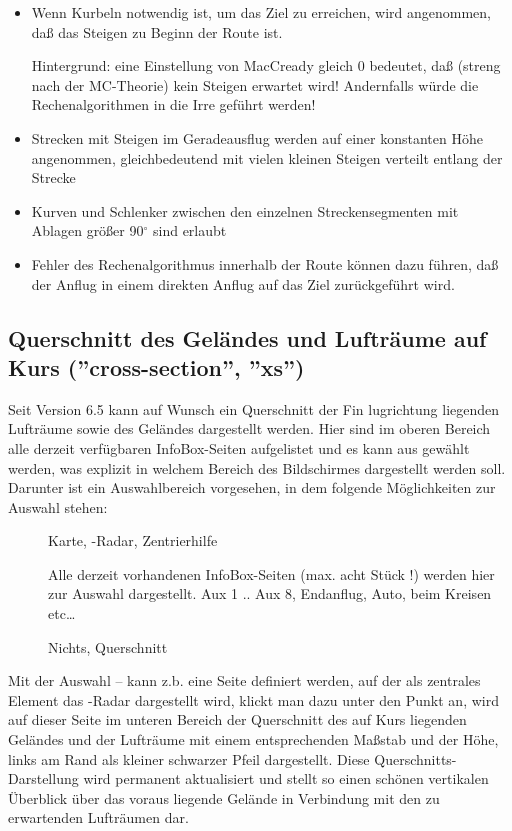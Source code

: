 \begin{itemize}
\item Wenn Kurbeln notwendig ist, um das Ziel zu erreichen,  wird angenommen, daß das Steigen zu Beginn der Route ist. 

Hintergrund: eine Einstellung von  MacCready gleich 0 bedeutet, daß (streng nach der MC-Theorie) kein Steigen erwartet wird!  Andernfalls würde die Rechenalgorithmen in  die Irre geführt werden!   
\item Strecken mit Steigen im Geradeausflug werden auf einer konstanten Höhe angenommen, gleichbedeutend mit vielen kleinen Steigen verteilt entlang der Strecke
\item Kurven und Schlenker zwischen den einzelnen Streckensegmenten mit Ablagen größer 90$^\circ$ sind erlaubt
\item Fehler des Rechenalgorithmus innerhalb der Route können dazu führen, daß der Anflug in einem direkten Anflug auf das Ziel zurückgeführt wird.
\end{itemize}


\subsection*{Querschnitt des Geländes und Lufträume auf Kurs (''cross-section'', ''xs'')}
\label{cross-section}

Seit Version 6.5 kann auf Wunsch  ein Querschnitt der Fin lugrichtung liegenden
 Lufträume sowie des Geländes
dargestellt werden. Hier sind im oberen Bereich alle derzeit verfügbaren InfoBox-Seiten
aufgelistet und es kann aus gewählt werden, was explizit in welchem Bereich des Bildschirmes
  dargestellt werden soll.
 Darunter ist ein Auswahlbereich vorgesehen, in dem folgende
Möglichkeiten zur Auswahl stehen:
 \begin{description}
 \item[] Karte, \fl-Radar, Zentrierhilfe
 \item[] Alle derzeit vorhandenen InfoBox-Seiten (max. acht Stück !) werden hier
     zur Auswahl dargestellt. Aux 1 .. Aux 8, Endanflug, Auto, beim Kreisen etc\dots
 \item[] Nichts, Querschnitt
 \end{description}

Mit der Auswahl -- kann z.b. eine Seite definiert werden,
auf der als zentrales Element das \fl-Radar dargestellt wird, klickt man dazu unter
 den Punkt an, wird auf dieser Seite im unteren Bereich der
Querschnitt des auf Kurs liegenden Geländes und der Lufträume mit einem entsprechenden
Maßstab und der Höhe, links am Rand als kleiner schwarzer Pfeil dargestellt. Diese
Querschnitts-Darstellung  wird permanent aktualisiert und stellt so einen schönen  vertikalen
Überblick über das voraus liegende Gelände in Verbindung mit den zu erwartenden Lufträumen
dar.

